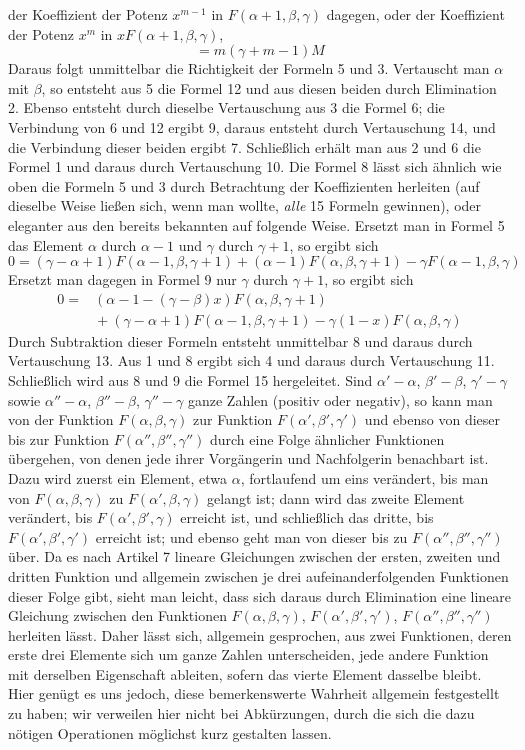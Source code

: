 der Koeffizient der Potenz $x^{m-1}$ in $F(\alpha+1,\beta,\gamma)$ dagegen, oder der Koeffizient der Potenz $x^m$ in $xF(\alpha+1,\beta,\gamma)$,
\[
=m(\gamma+m-1)M
\]
Daraus folgt unmittelbar die Richtigkeit der Formeln 5 und 3. Vertauscht man $\alpha$ mit $\beta$, so entsteht aus 5 die Formel 12 und aus diesen beiden durch Elimination 2. Ebenso entsteht durch dieselbe Vertauschung aus 3 die Formel 6; die Verbindung von 6 und 12 ergibt 9, daraus entsteht durch Vertauschung 14, und die Verbindung dieser beiden ergibt 7. Schließlich erhält man aus 2 und 6 die Formel 1 und daraus durch Vertauschung 10. Die Formel 8 lässt sich ähnlich wie oben die Formeln 5 und 3 durch Betrachtung der Koeffizienten herleiten (auf dieselbe Weise ließen sich, wenn man wollte, \textit{alle} 15 Formeln gewinnen), oder eleganter aus den bereits bekannten auf folgende Weise. Ersetzt man in Formel 5 das Element $\alpha$ durch $\alpha-1$ und $\gamma$ durch $\gamma+1$, so ergibt sich
\[
0=(\gamma-\alpha+1)F(\alpha-1,\beta,\gamma+1)+(\alpha-1)F(\alpha,\beta,\gamma+1)-\gamma F(\alpha-1,\beta,\gamma)
\]
Ersetzt man dagegen in Formel 9 nur $\gamma$ durch $\gamma+1$, so ergibt sich
\[
\begin{aligned}0={}&(\alpha-1-(\gamma-\beta)x)F(\alpha,\beta,\gamma+1)\\
&{}+(\gamma-\alpha+1)F(\alpha-1,\beta,\gamma+1)-\gamma(1-x)F(\alpha,\beta,\gamma)\end{aligned}
\]
Durch Subtraktion dieser Formeln entsteht unmittelbar 8 und daraus durch Vertauschung 13. Aus 1 und 8 ergibt sich 4 und daraus durch Vertauschung 11. Schließlich wird aus 8 und 9 die Formel 15 hergeleitet.
Sind $\alpha'-\alpha$, $\beta'-\beta$, $\gamma'-\gamma$ sowie $\alpha''-\alpha$, $\beta''-\beta$, $\gamma''-\gamma$ ganze Zahlen (positiv oder negativ), so kann man von der Funktion $F(\alpha,\beta,\gamma)$ zur Funktion $F(\alpha',\beta',\gamma')$ und ebenso von dieser bis zur Funktion $F(\alpha'',\beta'',\gamma'')$ durch eine Folge ähnlicher Funktionen übergehen, von denen jede ihrer Vorgängerin und Nachfolgerin benachbart ist. Dazu wird zuerst ein Element, etwa $\alpha$, fortlaufend um eins verändert, bis man von $F(\alpha,\beta,\gamma)$ zu $F(\alpha',\beta,\gamma)$ gelangt ist; dann wird das zweite Element verändert, bis
$F(\alpha',\beta',\gamma)$ erreicht ist, und schließlich das dritte, bis $F(\alpha',\beta',\gamma')$ erreicht ist; und ebenso geht man von dieser bis zu $F(\alpha'',\beta'',\gamma'')$ über. Da es nach Artikel 7 lineare Gleichungen zwischen der ersten, zweiten und dritten Funktion und allgemein zwischen je drei aufeinanderfolgenden Funktionen dieser Folge gibt, sieht man leicht, dass sich daraus durch Elimination eine lineare Gleichung zwischen den Funktionen $F(\alpha,\beta,\gamma)$, $F(\alpha',\beta',\gamma')$, $F(\alpha'',\beta'',\gamma'')$ herleiten lässt. Daher lässt sich, allgemein gesprochen, aus zwei Funktionen, deren erste drei Elemente sich um ganze Zahlen unterscheiden, jede andere Funktion mit derselben Eigenschaft ableiten, sofern das vierte Element dasselbe bleibt. Hier genügt es uns jedoch, diese bemerkenswerte Wahrheit allgemein festgestellt zu haben; wir verweilen hier nicht bei Abkürzungen, durch die sich die dazu nötigen Operationen möglichst kurz gestalten lassen.
